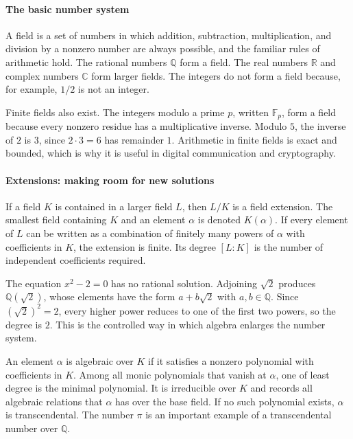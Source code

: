\paragraph{The basic number system}
A field is a set of numbers in which addition, subtraction, multiplication, and division by a nonzero number are always possible, and the familiar rules of arithmetic hold. The rational numbers $\mathbb{Q}$ form a field. The real numbers $\mathbb{R}$ and complex numbers $\mathbb{C}$ form larger fields. The integers do not form a field because, for example, $1/2$ is not an integer.

Finite fields also exist. The integers modulo a prime $p$, written $\mathbb{F}_p$, form a field because every nonzero residue has a multiplicative inverse. Modulo $5$, the inverse of $2$ is $3$, since $2\cdot3=6$ has remainder $1$. Arithmetic in finite fields is exact and bounded, which is why it is useful in digital communication and cryptography.

\paragraph{Extensions: making room for new solutions}
If a field $K$ is contained in a larger field $L$, then $L/K$ is a field extension. The smallest field containing $K$ and an element $\alpha$ is denoted $K(\alpha)$. If every element of $L$ can be written as a combination of finitely many powers of $\alpha$ with coefficients in $K$, the extension is finite. Its degree $[L:K]$ is the number of independent coefficients required.

The equation $x^2-2=0$ has no rational solution. Adjoining $\sqrt2$ produces $\mathbb{Q}(\sqrt2)$, whose elements have the form $a+b\sqrt2$ with $a,b\in\mathbb{Q}$. Since $(\sqrt2)^2=2$, every higher power reduces to one of the first two powers, so the degree is $2$. This is the controlled way in which algebra enlarges the number system.

An element $\alpha$ is algebraic over $K$ if it satisfies a nonzero polynomial with coefficients in $K$. Among all monic polynomials that vanish at $\alpha$, one of least degree is the minimal polynomial. It is irreducible over $K$ and records all algebraic relations that $\alpha$ has over the base field. If no such polynomial exists, $\alpha$ is transcendental. The number $\pi$ is an important example of a transcendental number over $\mathbb{Q}$.

